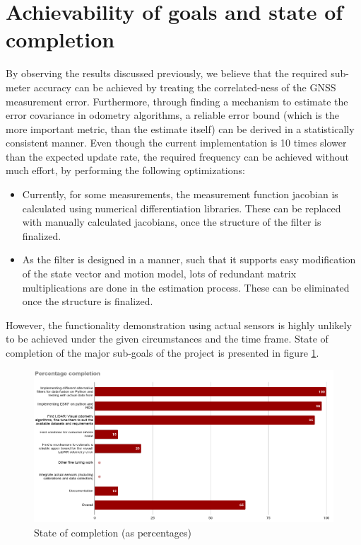\section{Achievability of goals and state of completion}
By observing the results discussed previously, we believe that the required sub-meter accuracy can be achieved by treating the correlated-ness of the \gls{GNSS} measurement error. Furthermore, through finding a mechanism to estimate the error covariance in odometry algorithms, a reliable error bound (which is the more important metric, than the estimate itself) can be derived in a statistically consistent manner. Even though the current implementation is 10 times slower than the expected update rate, the required frequency can be achieved without much effort, by performing the following optimizations:
\begin{itemize}
    \item Currently, for some measurements, the measurement function jacobian is calculated using numerical differentiation libraries. These can be replaced with manually calculated jacobians, once the structure of the filter is finalized.
    \item As the filter is designed in a manner, such that it supports easy modification of the state vector and motion model, lots of redundant matrix multiplications are done in the estimation process. These can be eliminated once the structure is finalized.
\end{itemize}
However, the functionality demonstration using actual sensors is highly unlikely to be achieved under the given circumstances and the time frame. State of completion of the major sub-goals of the project is presented in figure \ref{fig:pa:completionState}.
\begin{figure}[h]
	\centering
	\includegraphics[width=\textwidth]{figs/completion_state.png}
	\vspace{-0.5cm}
	\caption{State of completion (as percentages)}
	\label{fig:pa:completionState}
	\vspace{0.5cm}
\end{figure}